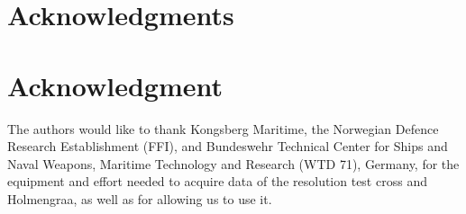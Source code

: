 \documentclass[10pt,journal,draftclsnofoot,onecolumn]{IEEEtran}
\newcommand\1{\vec 1}
\begin{document}
\ifCLASSOPTIONcompsoc
  \section*{Acknowledgments}
\else
  \section*{Acknowledgment}
\fi

The authors would like to thank Kongsberg Maritime, the Norwegian Defence Research Establishment (FFI), and Bundeswehr Technical Center for Ships and Naval Weapons, Maritime Technology and Research (WTD 71), Germany, for the equipment and effort needed to acquire data of the resolution test cross and Holmengraa, as well as for allowing us to use it.


\ifCLASSOPTIONcaptionsoff
  \newpage
\fi

\ifBuildBibliography
   
   

\else
\end{document}
